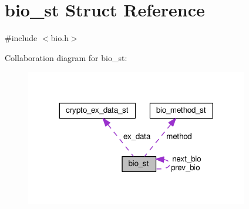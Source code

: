\hypertarget{structbio__st}{}\section{bio\+\_\+st Struct Reference}
\label{structbio__st}


{\ttfamily \#include $<$bio.\+h$>$}



Collaboration diagram for bio\+\_\+st\+:
\nopagebreak
\begin{figure}[H]
\begin{center}
\leavevmode
\includegraphics[width=276pt]{structbio__st__coll__graph}
\end{center}
\end{figure}
